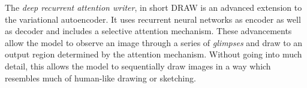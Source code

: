 The \emph{deep recurrent attention writer}, in short DRAW \cite{draw:2015} is an advanced extension to the variational autoencoder.
It uses recurrent neural networks as encoder as well as decoder and includes a selective attention mechanism.
These advancements allow the model to observe an image through a series of \emph{glimpses} and draw to an output region determined by the attention mechanism.
Without going into much detail, this allows the model to sequentially draw images in a way which resembles much of human-like drawing or sketching.



